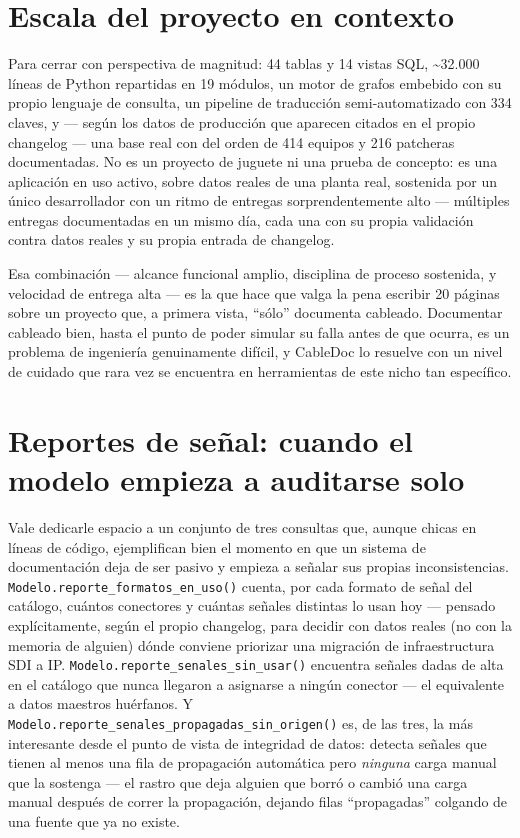 \documentclass[11pt,twocolumn]{article}
\begin{document}
\section{Escala del proyecto en contexto}

Para cerrar con perspectiva de magnitud: 44 tablas y 14 vistas SQL, \textasciitilde32.000 líneas de Python repartidas en 19 módulos, un motor de grafos embebido con su propio lenguaje de consulta, un pipeline de traducción semi-automatizado con 334 claves, y --- según los datos de producción que aparecen citados en el propio changelog --- una base real con del orden de 414 equipos y 216 patcheras documentadas. No es un proyecto de juguete ni una prueba de concepto: es una aplicación en uso activo, sobre datos reales de una planta real, sostenida por un único desarrollador con un ritmo de entregas sorprendentemente alto --- múltiples entregas documentadas en un mismo día, cada una con su propia validación contra datos reales y su propia entrada de changelog.

Esa combinación --- alcance funcional amplio, disciplina de proceso sostenida, y velocidad de entrega alta --- es la que hace que valga la pena escribir 20 páginas sobre un proyecto que, a primera vista, ``sólo'' documenta cableado. Documentar cableado bien, hasta el punto de poder simular su falla antes de que ocurra, es un problema de ingeniería genuinamente difícil, y CableDoc lo resuelve con un nivel de cuidado que rara vez se encuentra en herramientas de este nicho tan específico.

\section{Reportes de señal: cuando el modelo empieza a auditarse solo}

Vale dedicarle espacio a un conjunto de tres consultas que, aunque chicas en líneas de código, ejemplifican bien el momento en que un sistema de documentación deja de ser pasivo y empieza a señalar sus propias inconsistencias. \texttt{Modelo.reporte\_formatos\_en\_uso()} cuenta, por cada formato de señal del catálogo, cuántos conectores y cuántas señales distintas lo usan hoy --- pensado explícitamente, según el propio changelog, para decidir con datos reales (no con la memoria de alguien) dónde conviene priorizar una migración de infraestructura SDI a IP. \texttt{Modelo.reporte\_senales\_sin\_usar()} encuentra señales dadas de alta en el catálogo que nunca llegaron a asignarse a ningún conector --- el equivalente a datos maestros huérfanos. Y \texttt{Modelo.reporte\_senales\_propagadas\_sin\_origen()} es, de las tres, la más interesante desde el punto de vista de integridad de datos: detecta señales que tienen al menos una fila de propagación automática pero \emph{ninguna} carga manual que la sostenga --- el rastro que deja alguien que borró o cambió una carga manual después de correr la propagación, dejando filas ``propagadas'' colgando de una fuente que ya no existe.
\end{document}
